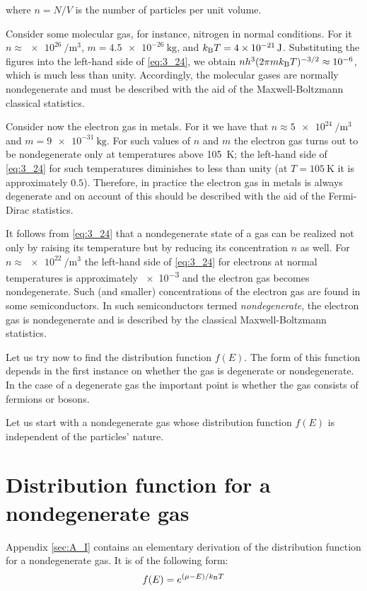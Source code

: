 where $n=N/V$ is the number of particles per unit volume.

Consider some molecular gas, for instance, nitrogen in normal conditions. For it $n\approx\SI{e26}{\per\metre\cubed}$, $m=\SI{4.5e-26}{\kilo\gram}$, and $k_{\text{B}}T=\SI{4e-21}{\joule}$. Substituting the figures into the left-hand side of \eqref{eq:3_24}, we obtain $nh^3(2\pi mk_{\text{B}}T)^{-3/2}\approx\num{e-6}$, which is much less than unity. Accordingly, the molecular gases are normally nondegenerate and must be described with the aid of the Maxwell-Boltzmann classical statistics.

Consider now the electron gas in metals. For it we have that $n\approx\SI{5e24}{\per\metre\cubed}$ and $m=\SI{9e-31}{\kilo\gram}$. For such values of $n$ and $m$ the electron gas turns out to be nondegenerate only at temperatures above \SI{105}{\kelvin}; the left-hand side of \eqref{eq:3_24} for such temperatures diminishes to less than unity (at $T=\SI{105}{\kelvin}$ it is approximately $0.5$). Therefore, in practice the electron gas in metals is always degenerate and on account of this should be described with the aid of the Fermi-Dirac statistics.

It follows from \eqref{eq:3_24} that a nondegenerate state of a gas can be realized not only by raising its temperature but by reducing its concentration $n$ as well. For $n\approx\SI{e22}{\per\metre\cubed}$ the left-hand side of \eqref{eq:3_24} for electrons at normal temperatures is approximately \num{e-3} and the electron gas becomes nondegenerate. Such (and smaller) concentrations of the electron gas are found in some semiconductors. In such semiconductors termed \textit{nondegenerate}, the electron gas is nondegenerate and is described by the classical Maxwell-Boltzmann statistics.

Let us try now to find the distribution function $f(E)$. The form of this function depends in the first instance on whether the gas is degenerate or nondegenerate. In the case of a degenerate gas the important point is whether the gas consists of fermions or bosons.

Let us start with a nondegenerate gas whose distribution function $f(E)$ is independent of the particles' nature.

\section{Distribution function for a nondegenerate gas}\label{sec:26}

Appendix \ref{sec:A_I} contains an elementary derivation of the distribution function for a nondegenerate gas. It is of the following form:
\begin{equation}\label{eq:3_25}
    f(E) = e^{(\mu - E) / k_{\text{B}} T}
\end{equation}

